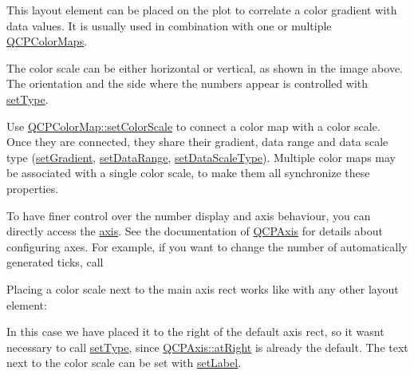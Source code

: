 This layout element can be placed on the plot to correlate a color gradient with data values. It is usually used in combination with one or multiple \mbox{\hyperlink{class_q_c_p_color_map}{Q\+C\+P\+Color\+Maps}}.



The color scale can be either horizontal or vertical, as shown in the image above. The orientation and the side where the numbers appear is controlled with \mbox{\hyperlink{class_q_c_p_color_scale_a1bf9bdb291927c422dd66b404b206f1f}{set\+Type}}.

Use \mbox{\hyperlink{class_q_c_p_color_map_aa828921db364fe3c6af4619580ab85fd}{Q\+C\+P\+Color\+Map\+::set\+Color\+Scale}} to connect a color map with a color scale. Once they are connected, they share their gradient, data range and data scale type (\mbox{\hyperlink{class_q_c_p_color_scale_a1f29583bb6f1e7f473b62fb712be3940}{set\+Gradient}}, \mbox{\hyperlink{class_q_c_p_color_scale_abe88633003a26d1e756aa74984587fef}{set\+Data\+Range}}, \mbox{\hyperlink{class_q_c_p_color_scale_aeb6107d67dd7325145b2498abae67fc3}{set\+Data\+Scale\+Type}}). Multiple color maps may be associated with a single color scale, to make them all synchronize these properties.

To have finer control over the number display and axis behaviour, you can directly access the \mbox{\hyperlink{class_q_c_p_color_scale_a39bdbdb3b212602a5a57f9f3ea444190}{axis}}. See the documentation of \mbox{\hyperlink{class_q_c_p_axis}{Q\+C\+P\+Axis}} for details about configuring axes. For example, if you want to change the number of automatically generated ticks, call 
\begin{DoxyCodeInclude}{0}
\end{DoxyCodeInclude}
 Placing a color scale next to the main axis rect works like with any other layout element\+: 
\begin{DoxyCodeInclude}{0}
\end{DoxyCodeInclude}
In this case we have placed it to the right of the default axis rect, so it wasn\textquotesingle{}t necessary to call \mbox{\hyperlink{class_q_c_p_color_scale_a1bf9bdb291927c422dd66b404b206f1f}{set\+Type}}, since \mbox{\hyperlink{class_q_c_p_axis_ae2bcc1728b382f10f064612b368bc18aadf5509f7d29199ef2f263b1dd224b345}{Q\+C\+P\+Axis\+::at\+Right}} is already the default. The text next to the color scale can be set with \mbox{\hyperlink{class_q_c_p_color_scale_aee124ae8396320cacf8276e9a0fbb8ce}{set\+Label}}.

